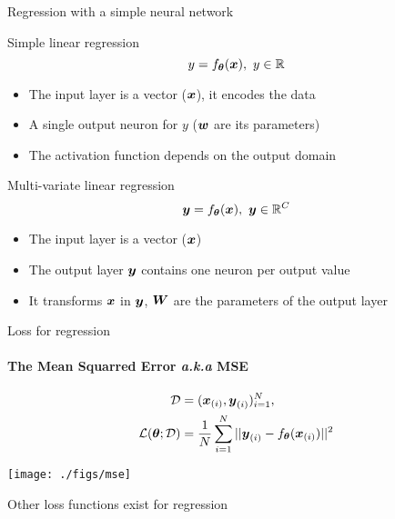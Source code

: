 \begin{frame}{Regression with a simple neural network}
  \begin{block}{Simple linear regression}
    $$
    y = f_{\boldsymbol{\theta}} (\boldsymbol{x}),\  y\in\mathbb{R}
    $$
    \begin{itemize}
    \item The input layer is a vector ($\boldsymbol{x}$), it encodes the data
    \item A single output neuron for $y$ ($\boldsymbol{w}$ are its parameters)
    \item The activation function depends on the output domain
    \end{itemize}
  \end{block}
  \begin{block}{Multi-variate linear regression}
    $$
    \boldsymbol{y} = f_{\boldsymbol{\theta}} (\boldsymbol{x}),\  \boldsymbol{y}\in\mathbb{R}^{C}
    $$
    \begin{itemize}
    \item The input layer is a vector ($\boldsymbol{x}$) 
    \item The output layer $\boldsymbol{y}$ contains one neuron per output value
    \item It transforms $\boldsymbol{x}$ in $\boldsymbol{y}$, $\boldsymbol{W}$ are the parameters of the output layer
    \end{itemize}
  \end{block}
\end{frame}


\begin{frame}{Loss for regression}
  \framesubtitle{The Mean Squarred Error \textit{a.k.a} MSE}
  \begin{align*}
\mathcal{D} &= (\boldsymbol{x}_{(i)}, \boldsymbol{y}_{(i)})_{i=1}^{N}, \\
\mathcal{L}(\boldsymbol{\theta};\mathcal{D}) &= \frac{1}{N} \sum_{i=1}^{N} ||\boldsymbol{y}_{(i)} - f_{\boldsymbol{\theta}}(\boldsymbol{x}_{(i)}) ||^2
  \end{align*}
  \begin{center}
    \texttt{[image: ./figs/mse]}
  \end{center}
  \begin{center}
    {\color{red} Other loss functions exist for regression}
  \end{center}

\end{frame}

